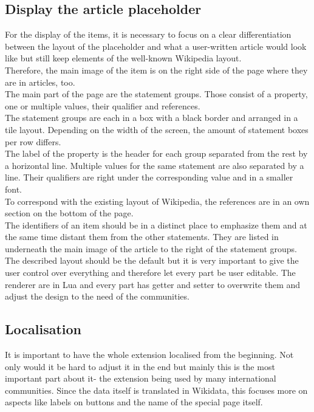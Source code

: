 \documentclass[11pt]{article}
\begin{document}
\subsection{Display the article placeholder}
For the display of the items, it is necessary to focus on a clear differentiation between the layout of the placeholder and what a user-written article would look like but still keep elements of the well-known Wikipedia layout. \\
Therefore, the main image of the item is on the right side of the page where they are in articles, too.\\
The main part of the page are the statement groups. Those consist of a property, one or multiple values, their qualifier and references. \\
The statement groups are each in a box with a black border and arranged in a tile layout. Depending on the width of the screen, the amount of statement boxes per row differs. \\
The label of the property is the header for each group separated from the rest by a horizontal line. Multiple values for the same statement are also separated by a line. Their qualifiers are right under the corresponding value and in a smaller font. \\
To correspond with the existing layout of Wikipedia, the references are in an own section on the bottom of the page. \\
The identifiers of an item should be in a distinct place to emphasize them and at the same time distant them from the other statements. They are listed in underneath the main image of the article to the right of the statement groups. \\
The described layout should be the default but it is very important to give the user control over everything and therefore let every part be user editable. The renderer are in Lua and every part has getter and setter to overwrite them and adjust the design to the need of the communities. \\

\subsection{Localisation}
It is important to have the whole extension localised from the beginning. Not only would it be hard to adjust it in the end but mainly this is the most important part about it- the extension being used by many international communities. Since the data itself is translated in Wikidata, this focuses more on aspects like labels on buttons and the name of the special page itself. \\
\end{document}
